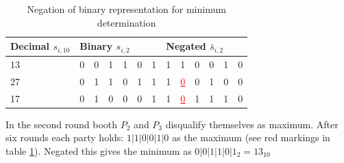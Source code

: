 \begin{table}[!htb]
	\centering
	\caption{Negation of binary representation for minimum determination} \label{table:secure minimum negation}
	\begin{tabular}{|l|l|l|l|l|l|l|l|l|l|l|l|l|}
		\hline
		Decimal $s_{i,10}$ & \multicolumn{6}{l|}{Binary $s_{i,2}$}  & \multicolumn{6}{l|}{Negated $\bar{s}_{i,2}$} \\ \hline
		13                 & 0    & 0    & 1    & 1    & 0   & 1 & 1    & 1    & 0    & 0    & 1   & 0   \\ \hline
		27                 & 0    & 1    & 1    & 0    & 1   & 1 & 1    & \textcolor{red}{\underline{0}} & 0    & 1    & 0   & 0   \\ \hline
		17                 & 0    & 1    & 0    & 0    & 0   & 1 & 1    & \textcolor{red}{\underline{0}} & 1    & 1    & 1   & 0   \\ \hline
	\end{tabular}
\end{table}

In the second round booth $P_2$ and $P_3$ disqualify themselves as maximum. After six rounds each party holds: $1|1|0|0|1|0$ as the maximum (see red markings in table \ref{table:secure minimum negation}). Negated this gives the minimum as $0|0|1|1|0|1_2=13_{10}$ 

\FloatBarrier

